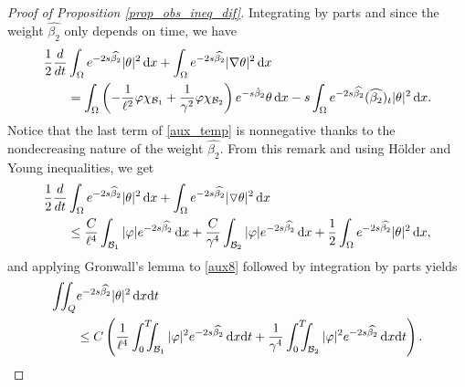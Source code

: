\documentclass{aims}
\theoremstyle{definition}
\newcommand\csin[1]{\chi_{#1}}
\def\dx{\,\textnormal{d}x}
\def\dt{\textnormal{d}t}
\begin{document}
\begin{proof}[Proof of Proposition \ref{prop_obs_ineq_dif}]
Integrating by parts and since the weight $\widehat{\beta_2}$ only depends on time, we have
%
\begin{equation}
\label{aux_temp}
\begin{split}
\frac12\frac{d}{dt}&\int_{\Omega}e^{-2s\widehat{\beta_2}}|\theta|^2\dx+\int_{\Omega}e^{-2s\widehat{\beta_2}}|\nabla \theta|^2\dx\\
&=\int_{\Omega}\left(-\frac{1}{\ell^2}\varphi\csin{\mathcal B_1}+\frac{1}{\gamma^2}\varphi \csin{\mathcal B_2}\right)e^{-s\hat{\beta}_2}\theta\dx-s\int_{\Omega}e^{-2s\widehat{\beta_2}}(\widehat{\beta_2})_t|\theta|^2\dx.
\end{split}
\end{equation}
%
 Notice that the last term of \eqref{aux_temp} is nonnegative thanks to the nondecreasing nature of the weight $\widehat{\beta_2}$. From this remark and using H\"older and Young inequalities, we get
 \begin{equation}
\label{aux8}
\begin{split}
\frac12\frac{d}{dt}&\int_{\Omega}e^{-2s\widehat{\beta}_2}|\theta|^2\dx+\int_{\Omega}e^{-2s\widehat{\beta_2}}|\triangledown \theta|^2\dx\\
&\leq \frac{C}{\ell^4}\int_{\mathcal B_1}|\varphi|e^{-2s\widehat{\beta_2}}\dx+\frac{C}{\gamma^4}\int_{\mathcal B_2}|\varphi|e^{-2s\widehat{\beta_2}}\dx+\frac12\int_{\Omega}e^{-2s\widehat{\beta_2}}|\theta|^2\dx, 
\end{split}
\end{equation}
and applying Gronwall's lemma to \eqref{aux8} followed by integration by parts yields
 \begin{equation}\label{aux9}
 \begin{split}
\iint_Q &e^{-2s\widehat{\beta_2}}|\theta|^2\dx\dt\\
&\leq C\left(\frac{1}{\ell^4}\int_0^T\!\!\!\!\int_{\mathcal B_1}|\varphi|^2e^{-2s\widehat{\beta_2}}\dx\dt+\frac{1}{\gamma^4}\int_0^T\!\!\!\!\int_{\mathcal B_2}|\varphi|^2e^{-2s\widehat{\beta_2}}\dx\dt\right).
\end{split}
\end{equation}
 

\end{proof}
\end{document}
